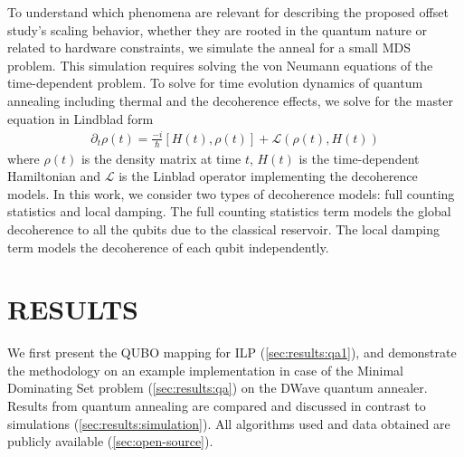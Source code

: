 \documentclass[prd,twocolumn,tightenlines,preprintnumbers,showpacs,superscriptaddress,notitlepage,nofootinbib,eqsecnum,floatfix,longbibliography,aps,10pt]{revtex4-2}
\begin{document}
To understand which phenomena are relevant for describing the proposed offset study's scaling behavior, whether they are rooted in the quantum nature or related to hardware constraints, we simulate the anneal for a small MDS problem.
This simulation requires solving the von Neumann equations of the time-dependent problem.
To solve for time evolution dynamics of quantum annealing including thermal and the decoherence effects, we solve for the master equation in Lindblad form
\begin{align}
 \partial_t \rho (t) =  \frac{-i}{\hbar} [H(t) , \rho(t)] + \mathcal{L}(\rho(t), H(t))
\end{align}
where $\rho (t)$ is the density matrix at time $t$, $H(t)$ is the time-dependent Hamiltonian and $\mathcal{L}$ is the Linblad operator implementing the decoherence models.
In this work, we consider two types of decoherence models: full counting statistics and local damping.
The full counting statistics term models the global decoherence to all the qubits due to the classical reservoir.
The local damping term models the decoherence of each qubit independently.





\section{RESULTS}
\label{sec:results}

We first present the QUBO mapping for ILP (\ref{sec:results:qa1}), and demonstrate the methodology on an example implementation in case of the Minimal Dominating Set problem (\ref{sec:results:qa}) on the DWave quantum annealer. Results from quantum annealing are compared and discussed in contrast to simulations (\ref{sec:results:simulation}). All algorithms used and data obtained are publicly available (\ref{sec:open-source}).

\end{document}
